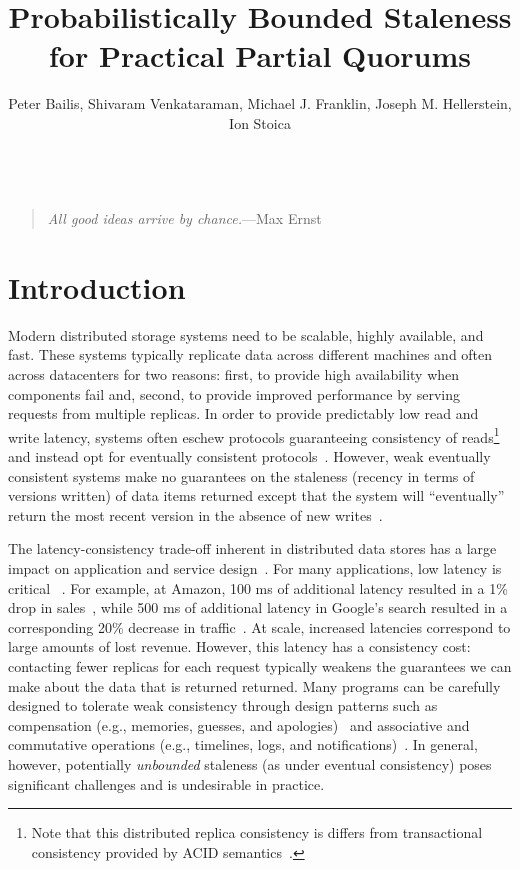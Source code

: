 \documentclass{vldb}
\title{Probabilistically Bounded Staleness\\ for Practical Partial Quorums}
\author{Peter Bailis, Shivaram Venkataraman, Michael J. Franklin, Joseph M. Hellerstein, Ion Stoica\\
\affaddr{University of California, Berkeley}\\
\affaddr{\{pbailis, shivaram, franklin, hellerstein, istoica\}@cs.berkeley.edu}}
\newcommand{\sectionskip}{-0em}
\begin{document}

\maketitle

\begin{quote}
\textit{All good ideas arrive by chance.}---Max Ernst
\end{quote}



\vspace{\sectionskip}\section{Introduction}

Modern distributed storage systems need to be scalable, highly
available, and fast.  These systems typically replicate data across
different machines and often across datacenters for two reasons:
first, to provide high availability when components fail and, second,
to provide improved performance by serving requests from multiple
replicas.  In order to provide predictably low read and write latency,
systems often eschew protocols guaranteeing consistency of
reads\footnote{Note that this distributed replica consistency is
  differs from transactional consistency provided by ACID
  semantics~\cite{nosql, urbanmyths}\vspace{-2em}.} and instead opt
for eventually consistent protocols~\cite{cassandradefault,
  abadilatconsist, dynamo, feinbergpc, reddit, riaktalkone, outbrain}.
However, weak eventually consistent systems make no guarantees on the
staleness (recency in terms of versions written) of data items
returned except that the system will ``eventually'' return the most
recent version in the absence of new writes~\cite{vogels-defs}.

The latency-consistency trade-off inherent in distributed data stores
has a large impact on application and service
design~\cite{abadilatconsist}. For many applications, low latency is
critical ~\cite{perf-impact}. For example, at Amazon, 100 ms of
additional latency resulted in a 1\% drop in
sales~\cite{amazon-latency}, while 500 ms of additional latency in
Google's search resulted in a corresponding 20\% decrease in
traffic~\cite{google-talk}.  At scale, increased latencies correspond
to large amounts of lost revenue.  However, this latency has a
consistency cost: contacting fewer replicas for each request typically
weakens the guarantees we can make about the data that is returned
returned. Many programs can be carefully designed to tolerate weak
consistency through design patterns such as compensation (e.g.,
memories, guesses, and apologies)~\cite{helland} and associative and
commutative operations (e.g., timelines, logs, and
notifications)~\cite{calm}.  In general, however, potentially
\textit{unbounded} staleness (as under eventual consistency) poses
significant challenges and is undesirable in practice.
\end{document}
